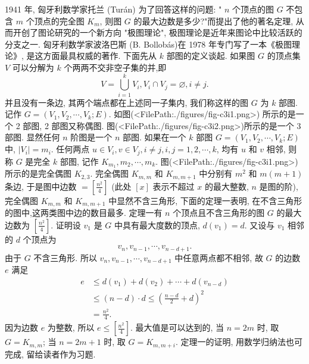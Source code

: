 
1941 年, 匈牙利数学家托兰 (Turán) 为了回答这样的问题: " $n$ 个顶点的图 $G$ 不包含 $m$ 个顶点的完全图 $K_m$, 则图 $G$ 的最大边数是多少?"而提出了他的著名定理, 从而开创了图论研究的一个新方向 "极图理论", 极图理论是近年来图论中比较活跃的分支之一.
匈牙利数学家波洛巴斯 (B. Bollobás)在 1978 年专门写了一本《极图理论》, 是这方面最具权威的著作.
下面先从 $k$ 部图的定义谈起.
如果图 $G$ 的顶点集 $V$ 可以分解为 $k$ 个两两不交非空子集的并,即
$$
V=\bigcup_{i=1}^k V_i, V_i \cap V_j=\varnothing, i \neq j .
$$
并且没有一条边, 其两个端点都在上述同一子集内, 我们称这样的图 $G$ 为 $k$ 部图.
记作 $G=\left(V_1, V_2, \cdots, V_k ; E\right)$.
如图(<FilePath:./figures/fig-c3i1.png>) 所示的是一个 2 部图, 2 部图又称偶图.
图(<FilePath:./figures/fig-c3i2.png>)所示的是一个 3 部图.
显然任何 $n$ 阶图是一个 $n$ 部图.
如果在一个 $k$ 部图 $G=\left(V_1, V_2, \cdots, V_k ; E\right)$ 中, $\left|V_i\right|=m_i$. 任何两点 $u \in V_i, v \in V_j, i \neq j, i, j=1,2, \cdots, k$, 均有 $u$ 和 $v$ 相邻, 则称 $G$ 是完全 $k$ 部图, 记作 $K_{m_1}, m_2, \cdots, m_k$. 图(<FilePath:./figures/fig-c3i1.png>)所示的是完全偶图 $K_{2,3}$.
完全偶图 $K_{m, m}$ 和 $K_{m, m+1}$ 中分别有 $m^2$ 和 $m(m+1)$ 条边, 于是图中边数 $=\left[\frac{n^2}{4}\right]$ (此处 $[x]$ 表示不超过 $x$ 的最大整数, $n$ 是图的阶), 完全偶图 $K_{m, m}$ 和 $K_{m, m+1}$ 中显然不含三角形, 下面的定理一表明, 在不含三角形的图中,这两类图中边的数目最多.
定理一有 $n$ 个顶点且不含三角形的图 $G$ 的最大边数为 $\left[\frac{n^2}{4}\right]$.
证明设 $v_1$ 是 $G$ 中具有最大度数的顶点, $d\left(v_1\right)=d$. 又设与 $v_1$ 相邻的 $d$ 个顶点为
$$
v_n, v_{n-1}, \cdots, v_{n-d+1} .
$$
由于 $G$ 不含三角形.
所以 $v_n, v_{n-1}, \cdots, v_{n-d+1}$ 中任意两点都不相邻, 故 $G$ 的边数 $e$ 满足
$$
\begin{aligned}
e & \leqslant d\left(v_1\right)+d\left(v_2\right)+\cdots+d\left(v_{n-d}\right) \\
& \leqslant(n-d) \cdot d \leqslant\left(\frac{n-d}{2}+d\right)^2 \\
& =\frac{n^2}{4} .
\end{aligned}
$$
因为边数 $e$ 为整数, 所以 $e \leqslant\left[\frac{n^2}{4}\right]$.
最大值是可以达到的, 当 $n=2 m$ 时, 取 $G=K_{m, m}$; 当 $n=2 m+1$ 时, 取 $G=K_{m, m+i}$.
定理一的证明, 用数学归纳法也可完成, 留给读者作为习题.



